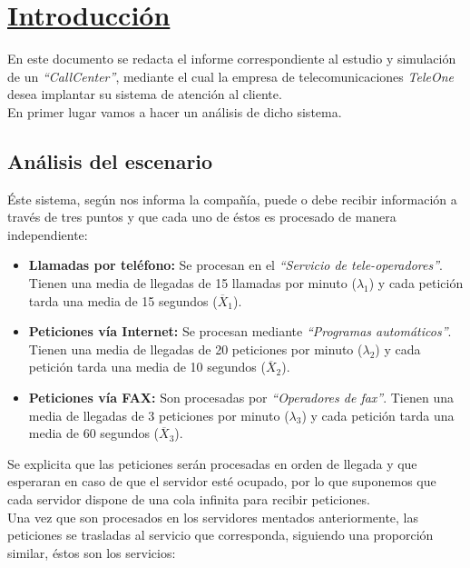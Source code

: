 \section{\textbf{\underline{Introducción}}}

En este documento se redacta el informe correspondiente al estudio y simulación de un \emph{``CallCenter''}, mediante el cual la empresa de telecomunicaciones \emph{TeleOne} desea implantar su sistema de atención al cliente.\\

En primer lugar vamos a hacer un análisis de dicho sistema.

\subsection{Análisis del escenario}
Éste sistema, según nos informa la compañía, puede o debe recibir información a través de tres puntos y que cada uno de éstos es procesado de manera independiente:

\begin{itemize}
  \item \textbf{Llamadas por teléfono:} Se procesan en el \emph{``Servicio de tele-operadores''}. Tienen una media de llegadas de 15 llamadas por minuto ($\lambda_{1}$) y cada petición tarda una media de 15 segundos ($\overline{X}_{1}$).
  \item \textbf{Peticiones vía Internet:} Se procesan mediante \emph{``Programas automáticos''}. Tienen una media de llegadas de 20 peticiones por minuto ($\lambda_{2}$) y cada petición tarda una media de 10 segundos ($\overline{X}_{2}$).
  \item \textbf{Peticiones vía FAX:} Son procesadas por \emph{``Operadores de fax''}. Tienen una media de llegadas de 3 peticiones por minuto ($\lambda_{3}$) y cada petición tarda una media de 60 segundos ($\overline{X}_{3}$).
\end{itemize}

Se explicita que las peticiones serán procesadas en orden de llegada y que esperaran en caso de que el servidor esté ocupado, por lo que suponemos que cada servidor dispone de una cola infinita para recibir peticiones.\\

Una vez que son procesados en los servidores mentados anteriormente, las peticiones se trasladas al servicio que corresponda, siguiendo una proporción similar, éstos son los servicios:

